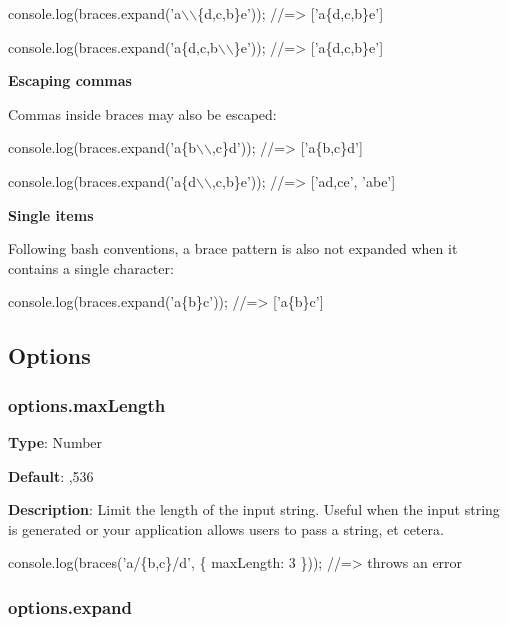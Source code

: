 \begin{DoxyCode}
console.log(braces.expand('a\(\backslash\)\(\backslash\)\{d,c,b\}e'));
//=> ['a\{d,c,b\}e']

console.log(braces.expand('a\{d,c,b\(\backslash\)\(\backslash\)\}e'));
//=> ['a\{d,c,b\}e']
\end{DoxyCode}


{\bfseries Escaping commas}

Commas inside braces may also be escaped\+:


\begin{DoxyCode}
console.log(braces.expand('a\{b\(\backslash\)\(\backslash\),c\}d'));
//=> ['a\{b,c\}d']

console.log(braces.expand('a\{d\(\backslash\)\(\backslash\),c,b\}e'));
//=> ['ad,ce', 'abe']
\end{DoxyCode}


{\bfseries Single items}

Following bash conventions, a brace pattern is also not expanded when it contains a single character\+:


\begin{DoxyCode}
console.log(braces.expand('a\{b\}c'));
//=> ['a\{b\}c']
\end{DoxyCode}


\subsection*{Options}

\subsubsection*{options.\+max\+Length}

{\bfseries Type}\+: {\ttfamily Number}

{\bfseries Default}\+: {,536}

{\bfseries Description}\+: Limit the length of the input string. Useful when the input string is generated or your application allows users to pass a string, et cetera.


\begin{DoxyCode}
console.log(braces('a/\{b,c\}/d', \{ maxLength: 3 \}));  //=> throws an error
\end{DoxyCode}


\subsubsection*{options.\+expand}

